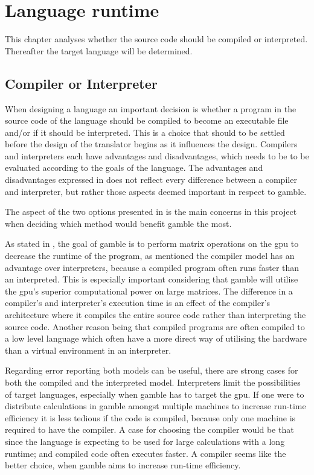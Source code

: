 \chapter{Language runtime}
This chapter analyses whether the source code should be compiled or interpreted.
Thereafter the target language will be determined. 

\section{Compiler or Interpreter}
When designing a language an important decision is whether a program in the source code of the language should be compiled to become an executable file and/or if it should be interpreted.
This is a choice that should to be settled before the design of the translator begins as it influences the design. 
Compilers and interpreters each have advantages and disadvantages, which needs to be to be evaluated according to the goals of the language.
The advantages and disadvantages expressed in  does not reflect every difference between a compiler and interpreter, but rather those aspects deemed important in respect to \gls{gamble}.



The aspect of the two options presented in  is the main concerns in this project when deciding which method would benefit \gls{gamble} the most.

As stated in , the goal of \gls{gamble} is to perform matrix operations on the \acrshort{gpu} to decrease the runtime of the program, as mentioned the compiler model has an advantage over interpreters, because a compiled program often runs faster than an interpreted. 
This is especially important considering that \gls{gamble} will utilise the \acrshort{gpu}'s superior computational power on large matrices. 
The difference in a compiler's and interpreter's execution time is an effect of the compiler's architecture where it compiles the entire source code rather than interpreting the source code. 
Another reason being that compiled programs are often compiled to a low level language which often have a more direct way of utilising the hardware than a virtual environment in an interpreter.

Regarding error reporting both models can be useful, there are strong cases for both the compiled and the interpreted model.
Interpreters limit the possibilities of target languages, especially when \gls{gamble} has to target the \acrshort{gpu}.
If one were to distribute calculations in \gls{gamble} amongst multiple machines to increase run-time efficiency it is less tedious if the code is compiled, because only one machine is required to have the compiler.
A case for choosing the compiler would be that since the language is expecting to be used for large calculations with a long runtime; and compiled code often executes faster.
A compiler seems like the better choice, when \gls{gamble} aims to increase run-time efficiency.

